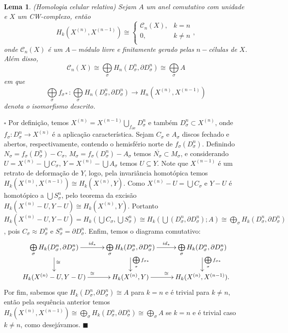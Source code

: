 \documentclass[12pt]{book}
\newtheorem{lema}[teorema]{Lema}
\newenvironment{prova}[1]{$\square$ #1}{\hfill$\blacksquare$}
\newcommand{\celula}[2]{D^{#1}_{#2}}
\newcommand{\celulabordo}[2]{\partial D^{#1}_{#2}}
\newcommand{\homologia}[2]{H_{#1}(#2;A)}
\newcommand{\homologiarel}[3]{H_{#1}(#2,#3)}
\newcommand{\homologiarelcel}[3]{H_{#1}(D^{#2}_{#3}, \partial D^{#2}_{#3})}
\newcommand{\homologiarelskelesimpl}[2]{H_{#1}(X^{(#2)}, X^{(#2-1)})}
\newcommand{\somadir}[1]{\bigoplus \limits_{#1}}
\newcommand{\skeleton}[1]{X^{(#1)}}
\begin{document}
	\begin{lema}\label{homologiacelular}
		(Homologia celular relativa) Sejam $A$ um anel comutativo com unidade e $X$ um CW-complexo, então
		$$
		\homologiarelskelesimpl{k}{n} \cong 
		\left\{
		\begin{array}{cc}
		\mathcal{C}_{n}(X), & k = n\\
		0, & k\neq n\\
		\end{array}
		\right.,
		$$
		onde $\mathcal{C}_{n}(X)$ é um $A-$módulo livre e finitamente gerado pelas $n-$células de $X$. Além disso,
		$$
		\mathcal{C}_{n}(X) \cong \somadir{\sigma} \homologiarelcel{n}{n}{\sigma} \cong \somadir{\sigma} A
		$$
		em que 
		$$
		\somadir{\sigma}f_{\sigma*}: \somadir{\sigma} \homologiarelcel{n}{n}{\sigma} \to \homologiarelskelesimpl{n}{n}
		$$
		denota o isomorfismo descrito.
	\end{lema}
	\begin{prova}
		Por definição, temos  $\skeleton{n} = \skeleton{n-1} \bigcup_{f_{\partial \sigma} } \celula{n}{\sigma}$ e também $\celula{n}{\sigma} \subset \skeleton{n}$, onde $f_{\sigma}:\celula{n}{\sigma} \to \skeleton{n}$ é a aplicação característica. Sejam $C_{\sigma}$ e $A_{\sigma}$ discos fechado e abertos, respectivamente, contendo o hemisfério norte de $f_{\sigma}(\celula{n}{\sigma})$. Definindo $N_{\sigma} = f_{\sigma}(\celula{n}{\sigma}) - C_{\sigma}$, $M_{\sigma} = f_{\sigma}(\celula{n}{\sigma}) - A_{\sigma}$ temos $\overline{N_{\sigma}} \subset M_{\sigma}$, e considerando $U = \skeleton{n} - \bigcup C_{\sigma}$, $Y = \skeleton{n} - \bigcup A_{\sigma}$ temos $U \subseteq Y$. Note que $\skeleton{n-1}$ é um retrato de deformação de $Y$, logo, pela invariância homotópica temos $\homologiarel{k}{\skeleton{n}}{\skeleton{n-1}} \cong  \homologiarel{k}{\skeleton{n}}{Y}$. Como $\skeleton{n} - U = \bigcup C_{\sigma}$ e $Y - U $ é homotópico a $\bigcup S^{n}_{\sigma}$, pelo teorema da excisão $\homologiarel{k}{\skeleton{n} - U}{Y- U} \cong \homologiarel{k}{\skeleton{n}}{Y}$. Portanto $\homologiarel{k}{\skeleton{n} - U}{Y- U} = \homologiarel{k}{\bigcup C_{\sigma}}{\bigcup S^{n}_{\sigma}} \cong \homologia{k}{\bigcup (\celula{n}{\sigma}, \celulabordo{n}{\sigma})} \cong \somadir{\sigma} \homologiarelcel{k}{n}{\sigma}$, pois $C_{\sigma} \approx \celula{n}{\sigma}$ e $S^{n}_{\sigma} = \celulabordo{n}{\sigma}$. Enfim, temos o diagrama comutativo:
		\[
		\xymatrix{
			\somadir{\sigma} \homologiarelcel{k}{n}{\sigma} \ar[r]^{id_{*}} \ar[d]^{\cong} & 
			\somadir{\sigma} \homologiarelcel{k}{n}{\sigma} \ar[r]^{id_{*}} \ar[d]^{\somadir{\sigma}f_{\sigma*}} & 
			\somadir{\sigma} \homologiarelcel{k}{n}{\sigma} \ar[d]^{\somadir{\sigma}f_{\sigma*}} 
			\\
			\homologiarel{k}{\skeleton{n} - U}{Y- U} \ar[r]^{\cong} & \homologiarel{k}{\skeleton{n}}{Y} \ar[r]^{\cong} & 
			\homologiarelskelesimpl{k}{n}.
		}
		\]
		Por fim, sabemos que $\homologiarelcel{k}{n}{\sigma} \cong A$ para $k=n$ e é trivial para $k\neq n$, então pela sequência anterior temos $\homologiarelskelesimpl{k}{n} \cong \somadir{\sigma}\homologiarelcel{k}{n}{\sigma} \cong \somadir{\sigma} A$ se $k=n$ e é trivial caso $k\neq n$, como desejávamos.
	\end{prova} 
	
\end{document}
